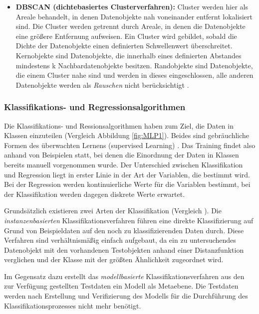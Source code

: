 \begin{itemize}
		\item \textbf{DBSCAN (dichtebasiertes Clusterverfahren):} Cluster werden hier als Areale behandelt, in denen Datenobjekte nah voneinander entfernt lokalisiert sind. Die Cluster werden getrennt durch Areale, in denen die Datenobjekte eine größere Entfernung aufweisen. Ein Cluster wird gebildet, sobald die Dichte der Datenobjekte einen definierten Schwellenwert überschreitet. Kernobjekte sind Datenobjekte, die innerhalb eines definierten Abstandes mindestens k Nachbardatenobjekte besitzen. Randobjekte sind Datenobjekte, die einem Cluster nahe sind und werden in dieses eingeschlossen, alle anderen Datenobjekte werden als \textit{Rauschen} nicht berücksichtigt .
\end{itemize}	

\subsubsection{Klassifikations- und Regressionsalgorithmen}
\label{section:klassifikationsalgorithmen}

Die Klassifikations- und Ressionsalgorithmen haben zum Ziel, die Daten in Klassen einzuteilen (Vergleich Abbildung \ref{fig:MLP1}). Beides sind gebräuchliche Formen des überwachten Lernens (supervised Learning) . Das Training findet also anhand von Beispielen statt, bei denen die Einordnung der Daten in Klassen bereits manuell vorgenommen wurde. Der Unterschied zwischen Klassifikation und Regression liegt in erster Linie in der Art der Variablen, die bestimmt wird. Bei der Regression werden kontinuierliche Werte für die Variablen bestimmt, bei der Klassifikation werden dagegen diskrete Werte erwartet. 

Grundsätzlich existieren zwei Arten der Klassifikation (Vergleich ). Die \textit{instanzenbasierten} Klassifikationsverfahren führen eine direkte Klassifizierung auf Grund von Beispieldaten auf den noch zu klassifizierenden Daten durch. Diese Verfahren sind verhältnismäßig einfach aufgebaut, da ein zu untersuchendes Datenobjekt mit den vorhandenen Testobjekten anhand einer Distanzfunktion verglichen und der Klasse mit der größten Ähnlichkeit zugeordnet wird. 

Im Gegensatz dazu erstellt das \textit{modellbasierte} Klassifikationsverfahren aus den zur Verfügung gestellten Testdaten ein Modell als Metaebene. Die Testdaten werden nach Erstellung und Verifizierung des Modells für die Durchführung des Klassifikationsprozesses nicht mehr benötigt.  

